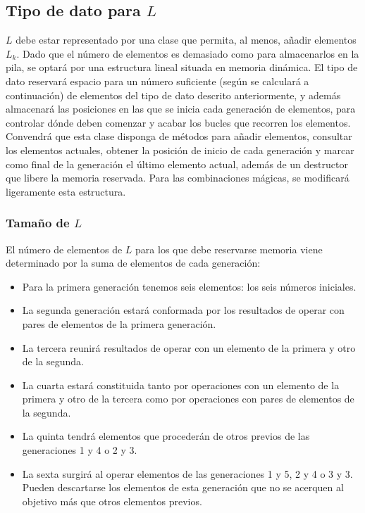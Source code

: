 \subsection{Tipo de dato para $L$}
$L$ debe estar representado por una clase que permita, al menos, añadir elementos $L_k$. Dado que el número de elementos es demasiado como para almacenarlos en la pila, se optará por una estructura lineal situada en memoria dinámica. El tipo de dato reservará espacio para un número suficiente (según se calculará a continuación) de elementos del tipo de dato descrito anteriormente, y además almacenará las posiciones en las que se inicia cada generación de elementos, para controlar dónde deben comenzar y acabar los bucles que recorren los elementos. \\

Convendrá que esta clase disponga de métodos para añadir elementos, consultar los elementos actuales, obtener la posición de inicio de cada generación y marcar como final de la generación el último elemento actual, además de un destructor que libere la memoria reservada. Para las combinaciones mágicas, se modificará ligeramente esta estructura. \\

\subsubsection{Tamaño de $L$}

El número de elementos de $L$ para los que debe reservarse memoria viene determinado por la suma de elementos de cada generación:
\begin{itemize}
	\item Para la primera generación tenemos seis elementos: los seis números iniciales.
	\item La segunda generación estará conformada por los resultados de operar con pares de elementos de la primera generación.
	\item La tercera reunirá resultados de operar con un elemento de la primera y otro de la segunda.
	\item La cuarta estará constituida tanto por operaciones con un elemento de la primera y otro de la tercera como por operaciones con pares de elementos de la segunda.
	\item La quinta tendrá elementos que procederán de otros previos de las generaciones 1 y 4 o 2 y 3.
	\item La sexta surgirá al operar elementos de las generaciones 1 y 5, 2 y 4 o 3 y 3. Pueden descartarse los elementos de esta generación que no se acerquen al objetivo más que otros elementos previos.
\end{itemize}

